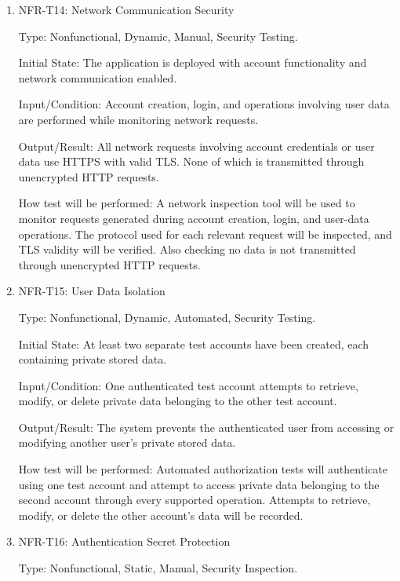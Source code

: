 \documentclass[12pt, titlepage]{article}
\begin{document}
\begin{enumerate}

\item{NFR-T14: Network Communication Security\\}

Type: Nonfunctional, Dynamic, Manual, Security Testing.

Initial State: The application is deployed with account functionality
and network communication enabled.

Input/Condition: Account creation, login, and operations involving
user data are performed while monitoring network requests.

Output/Result: All network requests involving account credentials
or user data use HTTPS with valid TLS. None of which is
transmitted through unencrypted HTTP requests.

How test will be performed: A network inspection tool will be used
to monitor requests generated during account creation, login, and
user-data operations. The protocol used for each relevant request
will be inspected, and TLS validity will be verified. Also checking
no data is not transmitted through unencrypted HTTP requests.

\item{NFR-T15: User Data Isolation\\}

Type: Nonfunctional, Dynamic, Automated, Security Testing.

Initial State: At least two separate test accounts have been
created, each containing private stored data.

Input/Condition: One authenticated test account attempts to retrieve,
modify, or delete private data belonging to the other test account.

Output/Result: The system prevents the authenticated user from
accessing or modifying another user's private stored data.

How test will be performed: Automated authorization tests will
authenticate using one test account and attempt to access private
data belonging to the second account through every supported
operation. Attempts to retrieve, modify, or delete the other
account's data will be recorded.

\item{NFR-T16: Authentication Secret Protection\\}

Type: Nonfunctional, Static, Manual, Security Inspection.


\end{enumerate}
\end{document}
